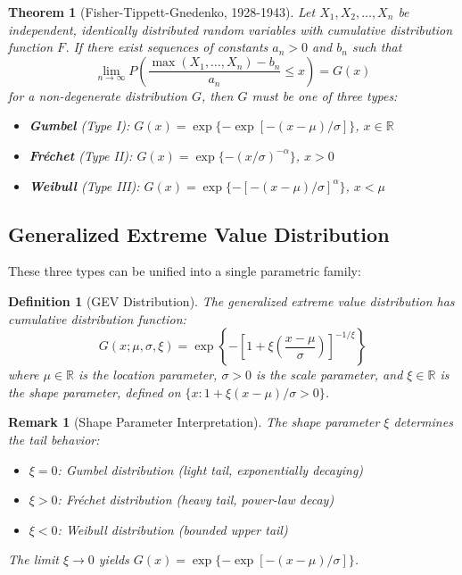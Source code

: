 \documentclass[a4paper, 11pt]{article}
\newtheorem{definition}{Definition}[section]
\newtheorem{theorem}{Theorem}[section]
\newtheorem{remark}{Remark}[section]
\begin{document}
\begin{theorem}[Fisher-Tippett-Gnedenko, 1928-1943]
Let $X_1, X_2, \ldots, X_n$ be independent, identically distributed random variables with
cumulative distribution function $F$. If there exist sequences of constants $a_n > 0$ and
$b_n$ such that
\begin{equation}
\lim_{n \to \infty} P\left(\frac{\max(X_1, \ldots, X_n) - b_n}{a_n} \leq x\right) = G(x)
\end{equation}
for a non-degenerate distribution $G$, then $G$ must be one of three types:
\begin{itemize}
\item \textbf{Gumbel} (Type I): $G(x) = \exp\{-\exp[-(x-\mu)/\sigma]\}$, $x \in \mathbb{R}$
\item \textbf{Fréchet} (Type II): $G(x) = \exp\{-(x/\sigma)^{-\alpha}\}$, $x > 0$
\item \textbf{Weibull} (Type III): $G(x) = \exp\{-[-(x-\mu)/\sigma]^{\alpha}\}$, $x < \mu$
\end{itemize}
\end{theorem}

\subsection{Generalized Extreme Value Distribution}

These three types can be unified into a single parametric family:

\begin{definition}[GEV Distribution]
The generalized extreme value distribution has cumulative distribution function:
\begin{equation}
G(x; \mu, \sigma, \xi) = \exp\left\{-\left[1 + \xi\left(\frac{x-\mu}{\sigma}\right)\right]^{-1/\xi}\right\}
\end{equation}
where $\mu \in \mathbb{R}$ is the location parameter, $\sigma > 0$ is the scale parameter,
and $\xi \in \mathbb{R}$ is the shape parameter, defined on $\{x: 1 + \xi(x-\mu)/\sigma > 0\}$.
\end{definition}

\begin{remark}[Shape Parameter Interpretation]
The shape parameter $\xi$ determines the tail behavior:
\begin{itemize}
\item $\xi = 0$: Gumbel distribution (light tail, exponentially decaying)
\item $\xi > 0$: Fréchet distribution (heavy tail, power-law decay)
\item $\xi < 0$: Weibull distribution (bounded upper tail)
\end{itemize}
The limit $\xi \to 0$ yields $G(x) = \exp\{-\exp[-(x-\mu)/\sigma]\}$.
\end{remark}
\end{document}
